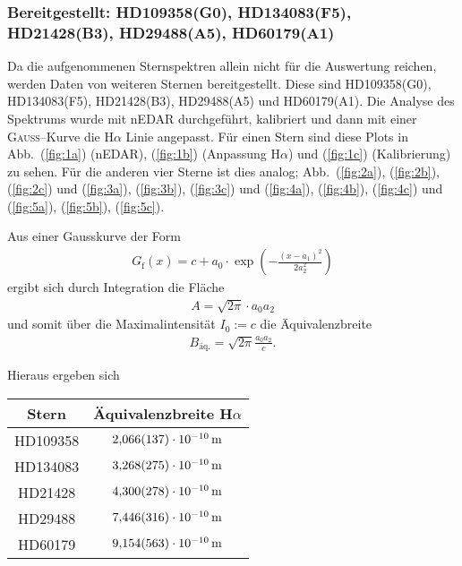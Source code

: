 \subsubsection{Bereitgestellt: HD109358(G0), HD134083(F5), HD21428(B3), HD29488(A5), HD60179(A1)}
Da die aufgenommenen Sternspektren allein nicht für die Auswertung reichen, werden Daten von weiteren Sternen bereitgestellt.
Diese sind HD109358(G0), HD134083(F5), HD21428(B3), HD29488(A5) und HD60179(A1).
Die Analyse des Spektrums wurde mit nEDAR durchgeführt, kalibriert und dann mit einer \textsc{Gauss}--Kurve die H$\alpha $ Linie angepasst.
Für einen Stern sind diese Plots in Abb.\ (\ref{fig:1a}) (nEDAR), (\ref{fig:1b}) (Anpassung H$\alpha $) und (\ref{fig:1c}) (Kalibrierung) zu sehen.
Für die anderen vier Sterne ist dies analog; Abb.\ (\ref{fig:2a}), (\ref{fig:2b}), (\ref{fig:2c}) und (\ref{fig:3a}), (\ref{fig:3b}), (\ref{fig:3c}) und (\ref{fig:4a}), (\ref{fig:4b}), (\ref{fig:4c}) und (\ref{fig:5a}), (\ref{fig:5b}), (\ref{fig:5c}).

Aus einer Gausskurve der Form
\begin{align}
  G_\textrm{f}(x)=c+a_0\cdot\exp(-\frac{(x-a_1)^2}{2a_2^2})
\end{align}
ergibt sich durch Integration die Fläche
\begin{align}
  A=\sqrt{2\pi}\cdot a_0a_2
\end{align}
und somit über die Maximalintensität $I_0:=c$ die Äquivalenzbreite
\begin{align}
  B_\textrm{äq.}=\sqrt{2\pi}\frac{a_0a_2}{c}.
\end{align}

Hieraus ergeben sich
\begin{table}[h]
  \begin{tabular}{cc}
    \toprule
    Stern & Äquivalenzbreite H$\alpha $\\
    \midrule
    HD109358 & $\SI{2.066+-0.137e-10}{m}$ \\
    HD134083 & $\SI{3.268+-0.275e-10}{m}$ \\
    HD21428 & $\SI{4.300+-0.278e-10}{m}$ \\
    HD29488 & $\SI{7.446+-0.316e-10}{m}$ \\
    HD60179 & $\SI{9.154+-0.563e-10}{m}$ \\
    \bottomrule
  \end{tabular}
\end{table} %

